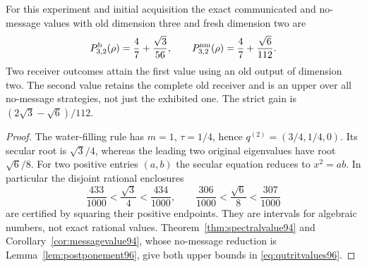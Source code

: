 \begin{proposition}
\label{prop:qutritwitness96}
For this experiment and initial acquisition the exact communicated
and no-message values with old dimension three and fresh dimension
two are
\begin{equation}\label{eq:qutritvalues96}
 P_{3,2}^{\rm b}(\rho)=\frac47+\frac{\sqrt3}{56},\qquad
 P_{3,2}^{\rm nm}(\rho)=\frac47+\frac{\sqrt6}{112}.
\end{equation}
Two receiver outcomes attain the first value using an old output of
dimension two.  The second value retains the complete old receiver
and is an upper over all no-message strategies, not just the exhibited
one.  The strict gain is $(2\sqrt3-\sqrt6)/112$.
\end{proposition}
\begin{proof}
The water-filling rule has $m=1$, $\tau=1/4$, hence
$q^{(2)}=(3/4,1/4,0)$.  Its secular root is $\sqrt3/4$, whereas
the leading two original eigenvalues have root $\sqrt6/8$.
For two positive entries $(a,b)$ the secular equation reduces to
$x^2=ab$.  In particular the disjoint rational enclosures
\[
 \frac{433}{1000}<\frac{\sqrt3}{4}<\frac{434}{1000},\qquad
 \frac{306}{1000}<\frac{\sqrt6}{8}<\frac{307}{1000}
\]
are certified by squaring their positive endpoints.  They are
intervals for algebraic numbers, not exact rational values.
Theorem~\ref{thm:spectralvalue94} and
Corollary~\ref{cor:messagevalue94}, whose no-message reduction is
Lemma~\ref{lem:postponement96}, give both upper bounds in
\eqref{eq:qutritvalues96}.


\end{proof}
